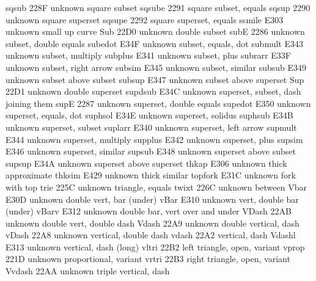  sqsub                 228F {unknown} square subset
 sqsube                2291 {\sqsubseteq} square subset, equals
 sqsup                 2290 {unknown} square superset
 sqsupe                2292 {\sqsupseteq} square superset, equals
 ssmile                E303 {unknown} small up curve
 Sub                   22D0 {unknown} double subset
 subE                  2286 {unknown} subset, double equals
 subedot               E34F {unknown} subset, equals, dot
 submult               E343 {unknown} subset, multiply
 subplus               E341 {unknown} subset, plus
 subrarr               E33F {unknown} subset, right arrow
 subsim                E345 {unknown} subset, similar
 subsub                E349 {unknown} subset above subset
 subsup                E347 {unknown} subset above superset
 Sup                   22D1 {unknown} double superset
 supdsub               E34C {unknown} superset, subset, dash joining them
 supE                  2287 {unknown} superset, double equals
 supedot               E350 {unknown} superset, equals, dot
 suphsol               E34E {unknown} superset, solidus
 suphsub               E34B {unknown} superset, subset
 suplarr               E340 {unknown} superset, left arrow
 supmult               E344 {unknown} superset, multiply
 supplus               E342 {unknown} superset, plus
 supsim                E346 {unknown} superset, similar
 supsub                E348 {unknown} superset above subset
 supsup                E34A {unknown} superset above superset
 thkap                 E306 {unknown} thick approximate
 thksim                E429 {unknown} thick similar
 topfork               E31C {unknown} fork with top
 trie                  225C {unknown} triangle, equals
 twixt                 226C {unknown} between
 Vbar                  E30D {unknown} double vert, bar (under)
 vBar                  E310 {unknown} vert, double bar (under)
 vBarv                 E312 {unknown} double bar, vert over and under
 VDash                 22AB {unknown} double vert, double dash
 Vdash                 22A9 {unknown} double vertical, dash
 vDash                 22A8 {unknown} vertical, double dash
 vdash                 22A2 {\vdash} vertical, dash
 Vdashl                E313 {unknown} vertical, dash (long)
 vltri                 22B2 {\triangleleft} left triangle, open, variant
 vprop                 221D {unknown} proportional, variant
 vrtri                 22B3 {\triangleright} right triangle, open, variant
 Vvdash                22AA {unknown} triple vertical, dash
